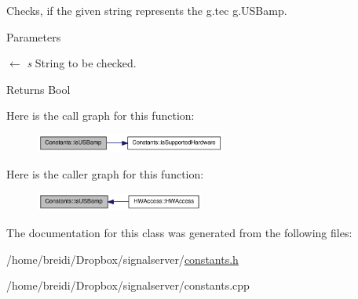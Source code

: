 Checks, if the given string represents the g.tec g.USBamp. 
\begin{DoxyParams}{Parameters}
\item[\mbox{$\leftarrow$} {\em s}]String to be checked. \end{DoxyParams}
\begin{DoxyReturn}{Returns}
Bool 
\end{DoxyReturn}


Here is the call graph for this function:\nopagebreak
\begin{figure}[H]
\begin{center}
\leavevmode
\includegraphics[width=177pt]{class_constants_a9783854161bd324f9aa14f66d460b7a5_cgraph}
\end{center}
\end{figure}


Here is the caller graph for this function:\nopagebreak
\begin{figure}[H]
\begin{center}
\leavevmode
\includegraphics[width=156pt]{class_constants_a9783854161bd324f9aa14f66d460b7a5_icgraph}
\end{center}
\end{figure}


The documentation for this class was generated from the following files:\begin{DoxyCompactItemize}
\item 
/home/breidi/Dropbox/signalserver/\hyperlink{constants_8h}{constants.h}\item 
/home/breidi/Dropbox/signalserver/constants.cpp\end{DoxyCompactItemize}
